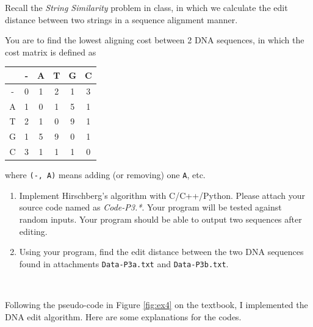 \begin{exercise}{Recall the \emph{String Similarity} problem in class, in which we calculate the edit distance between two strings in a sequence alignment manner.

    You are to find the lowest aligning cost between 2 DNA sequences, in which the cost matrix is defined as

    \begin{center}
        \begin{tabular}{|c||c|c|c|c|c|}
        \hline
          & - & A & T & G & C \\
        \hline
        - & 0 & 1 & 2 & 1 & 3 \\
        A & 1 & 0 & 1 & 5 & 1 \\
        T & 2 & 1 & 0 & 9 & 1 \\
        G & 1 & 5 & 9 & 0 & 1 \\
        C & 3 & 1 & 1 & 1 & 0 \\
        \hline
        \end{tabular}
    \end{center}

    where \texttt{(-, A)} means adding (or removing) one \texttt{A}, etc.

    \begin{enumerate}
        \item
        Implement Hirschberg's algorithm with C/C++/Python. Please attach your source code named as {\color{red}\emph{Code-P3.*}}. Your program will be tested against random inputs. Your program should be able to output two sequences after editing.

        \item
        Using your program, find the edit distance between the two DNA sequences found in attachments \texttt{Data-P3a.txt} and \texttt{Data-P3b.txt}.
    \end{enumerate}}
  \begin{solution}
  \par{~}

  Following the pseudo-code in Figure \ref{fig:ex4} on the textbook, I implemented the DNA edit algorithm. Here are some explanations for the codes.


\end{solution}
\end{exercise}
